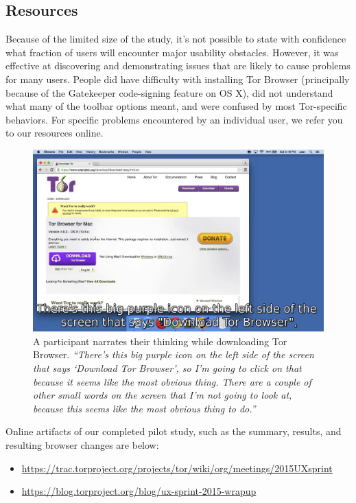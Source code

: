 \documentclass[letterpaper,twocolumn,11pt]{article}
\begin{document}
\subsection{Resources}

\indent \indent Because of the limited size of the study, it's not possible to state with confidence what 
fraction of users will encounter major usability obstacles. However, it was effective at discovering 
and demonstrating issues that are likely to cause problems for many users. 
People did have difficulty with installing Tor Browser (principally because of the Gatekeeper 
code-signing feature on OS X), did not understand what many of the toolbar options meant, 
and were confused by most Tor-specific behaviors. For specific problems 
encountered by an individual user, we refer you to our resources online. 

\begin{figure}
\includegraphics[width=\linewidth]{walkthrough.png}
\caption{
A participant narrates their thinking
while downloading Tor Browser.
{
\it
``There's this big purple icon on the left side of the screen that says `Download Tor Browser',
so I'm going to click on that because it seems like the most obvious thing.
There are a couple of other small words on the screen that I'm not going to look at, because this seems like the most obvious thing to do.''
}
}
\label{walkthrough}
\end{figure}

\indent \indent  Online artifacts of our completed pilot study, such as 
the summary, results, and resulting browser changes are below:
\begin{itemize} \itemsep1pt \parskip0pt 
\item \url{https://trac.torproject.org/projects/tor/wiki/org/meetings/2015UXsprint}
\item \url{https://blog.torproject.org/blog/ux-sprint-2015-wrapup}
\end{itemize}
\end{document}

